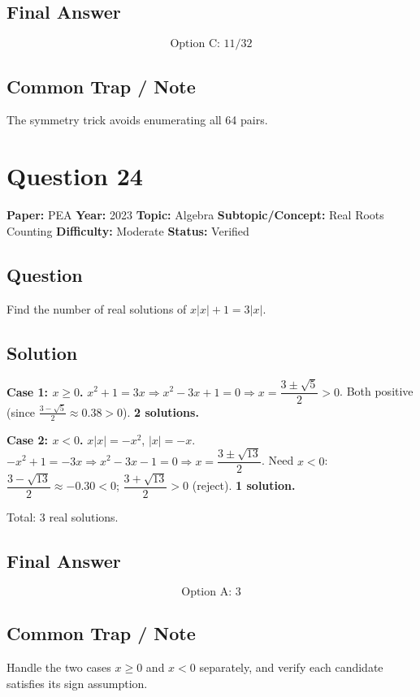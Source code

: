 \documentclass[11pt]{article}
\begin{document}
\subsection*{Final Answer}
\[
\boxed{\text{Option C: } 11/32}
\]

\subsection*{Common Trap / Note}
The symmetry trick avoids enumerating all 64 pairs.

\medskip

\section*{Question 24}
\textbf{Paper:} PEA \quad \textbf{Year:} 2023 \quad \textbf{Topic:} Algebra \quad \textbf{Subtopic/Concept:} Real Roots Counting \quad \textbf{Difficulty:} Moderate \quad \textbf{Status:} Verified

\subsection*{Question}
Find the number of real solutions of $x|x|+1=3|x|$.

\subsection*{Solution}
\textbf{Case 1: $x\ge 0$.} $x^2+1=3x\Rightarrow x^2-3x+1=0\Rightarrow x=\dfrac{3\pm\sqrt 5}{2}>0$. Both positive (since $\frac{3-\sqrt 5}{2}\approx 0.38>0$). \textbf{2 solutions.}

\textbf{Case 2: $x<0$.} $x|x|=-x^2$, $|x|=-x$. $-x^2+1=-3x\Rightarrow x^2-3x-1=0\Rightarrow x=\dfrac{3\pm\sqrt{13}}{2}$. Need $x<0$: $\dfrac{3-\sqrt{13}}{2}\approx-0.30<0$; $\dfrac{3+\sqrt{13}}{2}>0$ (reject). \textbf{1 solution.}

Total: $3$ real solutions.

\subsection*{Final Answer}
\[
\boxed{\text{Option A: } 3}
\]

\subsection*{Common Trap / Note}
Handle the two cases $x\ge 0$ and $x<0$ separately, and verify each candidate satisfies its sign assumption.
\end{document}
